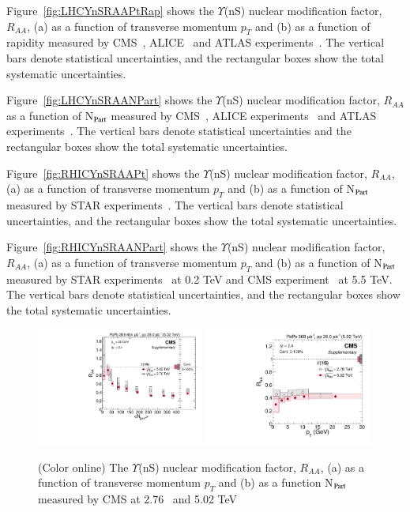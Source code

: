 Figure~\ref{fig:LHCYnSRAAPtRap} shows
    the $\Upsilon$(nS) nuclear modification factor, $R_{AA}$, (a) as a function of transverse momentum $p_{T}$
    and (b) as a function of rapidity measured by CMS~\cite{CMS:2018zza}, ALICE~\cite{ALICE:2020wwx}
    and ATLAS experiments~\cite{ALICE:2020wwx}.
    The vertical bars denote statistical uncertainties, and the rectangular boxes show the total systematic uncertainties.

Figure~\ref{fig:LHCYnSRAANPart} shows
  the $\Upsilon$(nS) nuclear modification factor, $R_{AA}$ as a function of N$_{\rm Part}$
    measured by CMS~\cite{CMS:2018zza}, ALICE experiments~\cite{ALICE:2020wwx} and ATLAS experiments~\cite{ALICE:2020wwx}.
    The vertical bars denote statistical uncertainties and the rectangular boxes show the total systematic uncertainties.

Figure~\ref{fig:RHICYnSRAAPt} shows
  the $\Upsilon$(nS) nuclear modification factor, $R_{AA}$, (a) as a function of transverse momentum $p_{T}$
    and (b) as a function of N$_{\rm Part}$ measured by STAR experiments~\cite{Wang:2019vau}. The vertical bars denote
    statistical uncertainties, and the rectangular boxes show the total systematic uncertainties.


Figure~\ref{fig:RHICYnSRAANPart} shows
  the $\Upsilon$(nS) nuclear modification factor, $R_{AA}$, (a) as a function of transverse momentum $p_{T}$
  and (b) as a function of N$_{\rm Part}$ measured by STAR experiments~\cite{Wang:2019vau} at 0.2 TeV and
  CMS experiment~\cite{CMS:2018zza} at 5.5 TeV. The vertical bars denote statistical uncertainties, and the
  rectangular boxes show the total systematic uncertainties.


\begin{figure}
  \includegraphics[width=0.49\textwidth]{Figures/ExpOverview/CMS-HIN-16-023_Figure-aux_001.pdf}
    \includegraphics[width=0.49\textwidth]{Figures/ExpOverview/CMS-HIN-16-023_Figure-aux_002.pdf}
  \caption{(Color online) The $\Upsilon$(nS) nuclear modification factor, $R_{AA}$, (a) as a function of transverse momentum $p_{T}$
    and (b) as a function N$_{\rm Part}$ measured by CMS
    at 2.76~\cite{Khachatryan:2016xxp} and 5.02 TeV~\cite{CMS:2018zza}
  }
  \label{fig:LHCYnSRAAenergy}
\end{figure}

